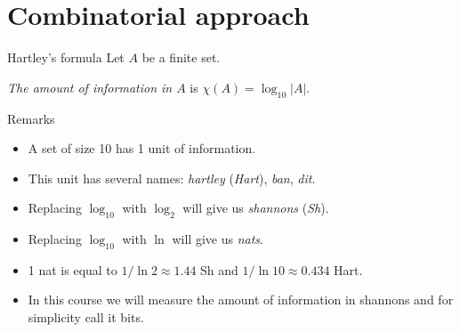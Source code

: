 \documentclass[aspectratio=169]{beamer}
\begin{document}
\section{Combinatorial approach}
\begin{frame}{Hartley's formula}
Let \(A\) be a finite set.
\begin{definition}
     \emph{The amount of information in \(A\)} is \(\chi(A) = \log_{10}|A|\).
\end{definition}

\pause

\begin{block}{Remarks}
\begin{itemize}
    \item A set of size 10 has 1 unit of information.

    \item This unit has several names: \emph{hartley} (\emph{Hart}), \emph{ban}, \emph{dit}.

    \item Replacing $\log_{10}$ with $\log_2$ will give us \emph{shannons} (\emph{Sh}).

    \item Replacing $\log_{10}$ with $\ln$ will give us \emph{nats}.

    \item 1 nat is equal to $1/\ln 2 \approx 1.44$ Sh and $1/\ln 10 \approx 0.434$ Hart.

    \item In this course we will measure the amount of information in shannons and for simplicity call it bits.

\end{itemize}
\end{block}
\end{frame}
\end{document}
